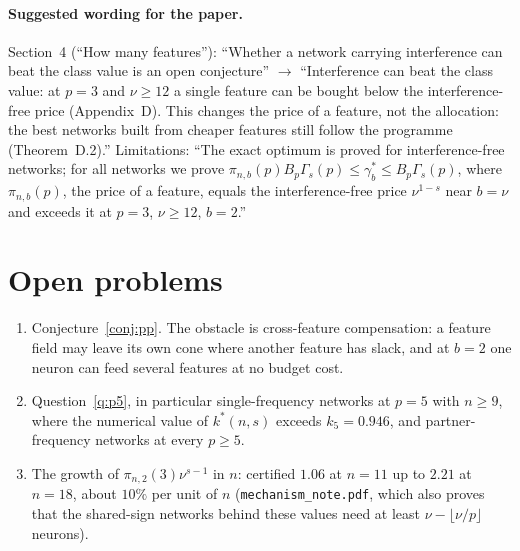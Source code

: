 \documentclass[11pt]{article}
\theoremstyle{definition}
\begin{document}
\paragraph{Suggested wording for the paper.}  Section~4 (``How many features''): ``Whether a network carrying
interference can beat the class value is an open conjecture'' $\to$ ``Interference can beat the class value: at $p=3$
and $\nu\ge12$ a single feature can be bought below the interference-free price (Appendix~D).  This changes the price of
a feature, not the allocation: the best networks built from cheaper features still follow the programme
(Theorem~D.2).''  Limitations: ``The exact optimum is proved for interference-free networks; for all networks we prove
$\pi_{n,b}(p)B_p\Gamma_s(p)\le\gamma^*_b\le B_p\Gamma_s(p)$, where $\pi_{n,b}(p)$, the price of a feature, equals the
interference-free price $\nu^{1-s}$ near $b=\nu$ and exceeds it at $p=3$, $\nu\ge12$, $b=2$.''

\section{Open problems}
\begin{enumerate}
\item Conjecture~\ref{conj:pp}.  The obstacle is cross-feature compensation: a feature field may leave its own cone
where another feature has slack, and at $b=2$ one neuron can feed several features at no budget cost.
\item Question~\ref{q:p5}, in particular single-frequency networks at $p=5$ with $n\ge9$, where the numerical value of
$k^*(n,s)$ exceeds $k_5=0.946$, and partner-frequency networks at every $p\ge5$.
\item The growth of $\pi_{n,2}(3)\nu^{s-1}$ in $n$: certified $1.06$ at $n=11$ up to $2.21$ at $n=18$, about $10\%$ per
unit of $n$ (\texttt{mechanism\_note.pdf}, which also proves that the shared-sign networks behind these values need at
least $\nu-\lfloor\nu/p\rfloor$ neurons).
\end{enumerate}
\end{document}
